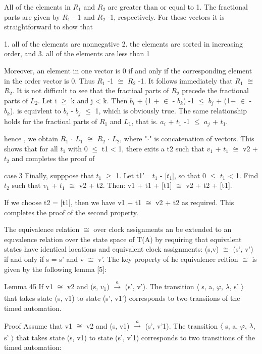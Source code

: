 All of the elements in $R_1$ and $R_2$ are greater than or equal to 1. The fractional parts are given by $R_1$ - 1 and $R_2$ -1, respectively. For these vectors it is straightforward to show that

1. all of the elements are nonnegative
2. the elements are sorted in increasing order, and
3. all of the elements are less than 1

Moreover, an element in one vector is 0 if and only if the corresponding element in the order vector is 0. Thus $R_1$ -1 $\cong$ $R_2$ -1. It follows immediately that $R_1$ $\cong$ $R_2$.
It is not difficult to see that the fractioal parts of $R_2$ precede the fractional parts of $L_2$.
Let i  $\geq$ k and j < k. Then
$b_i$ +  (1 + $\in$ - $b_k$) -1 $\leq$ $b_j$ + (1+ $\in$ - $b_k$).
is equivlent to $b_i$ - $b_j$ $\leq$ 1, which is obviously true. The same relationship holds for the fractioal parts of $R_1$ and $L_1$, that is.
$a_i$ + $t_1$ -1 $\leq$ $a_j$ + $t_1$.

hence , we obtain $R_1$ $\cdot$ $L_1$ $\cong$ $R_2$ $\cdot$ $L_2$, where "$\cdot$" is concatenation of vectors. This shows that for all $t_1$ with 0 $\leq$ t1 < 1, there exits a t2 such that $v_1$ + $t_1$ $\cong$ v2 + $t_2$ and completes the proof of 



case 3
Finally, supppose that $t_1$ $\geq$ 1. Let t1'= $t_1$ - [$t_1$], so that 0 $\leq$ $t_1$ < 1. Find $t_2$ such that $v_1$ + $t_1$ $\cong$ v2 + t2. Then:
v1 + t1 + [t1]  $\cong$ v2 + t2 + [t1].

If we choose t2 = [t1], then we have v1 + t1 $\cong$ v2 + t2 as required. This completes the proof of the second property.

The equivalence relation $\cong$ over clock assignments an be extended to an equvalence relation over the state space of T(A) by requiring that equivalent states have identical locations and equivalent clock assignments: (s,v) $\cong$ (s', v') if and only if s = s' and v $\cong$ v'. The key property of he equivalence reltion $\cong$ is given by the following lemma [5]:


Lemma 45
If v1 $\cong$ v2 and (s, $v_1$)  $\xrightarrow[]{a}$ (s', v'). The transition $\langle$ s, a, $\varphi$, $\lambda$, s' $\rangle$  that takes state (s, v1) to state (s', v1') corresponds to two transiions of the timed automation.

Proof
Assume that v1 $\cong$ v2 and (s, v1)  $\xrightarrow[]{a}$ (s', v'1). The transition $\langle$ s, a, $\varphi$, $\lambda$, s' $\rangle$ that takes state (s, v1) to state (s', v'1) corresponds to two transitions of the timed automation:

